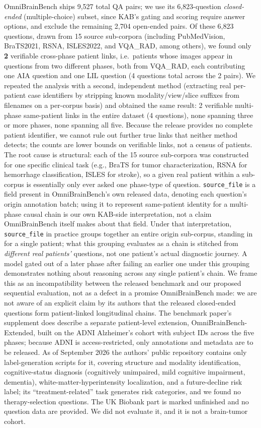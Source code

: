 \documentclass[11pt]{article}
\begin{document}
OmniBrainBench ships 9,527 total QA pairs; we use its 6,823-question \emph{closed-ended} (multiple-choice) subset, since KAB's gating and scoring require answer options, and exclude the remaining 2,704 open-ended pairs. Of these 6,823 questions, drawn from 15 source sub-corpora (including PubMedVision, BraTS2021, RSNA, ISLES2022, and VQA\_RAD, among others), we found only \textbf{2} verifiable cross-phase patient links, i.e.\ patients whose images appear in questions from two different phases, both from VQA\_RAD, each contributing one AIA question and one LIL question (4 questions total across the 2 pairs). We repeated the analysis with a second, independent method (extracting real per-patient case identifiers by stripping known modality/view/slice suffixes from filenames on a per-corpus basis) and obtained the same result: 2 verifiable multi-phase same-patient links in the entire dataset (4 questions), none spanning three or more phases, none spanning all five. Because the release provides no complete patient identifier, we cannot rule out further true links that neither method detects; the counts are lower bounds on verifiable links, not a census of patients. The root cause is structural: each of the 15 source sub-corpora was constructed for one specific clinical task (e.g., BraTS for tumor characterization, RSNA for hemorrhage classification, ISLES for stroke), so a given real patient within a sub-corpus is essentially only ever asked one phase-type of question. \texttt{source\_file} is a field present in OmniBrainBench's own released data, denoting each question's origin annotation batch; using it to represent same-patient identity for a multi-phase causal chain is our own KAB-side interpretation, not a claim OmniBrainBench itself makes about that field. Under that interpretation, \texttt{source\_file} in practice groups together an entire origin sub-corpus, standing in for a single patient; what this grouping evaluates as a chain is stitched from \emph{different real patients'} questions, not one patient's actual diagnostic journey. A model gated out of a later phase after failing an earlier one under this grouping demonstrates nothing about reasoning across any single patient's chain. We frame this as an incompatibility between the released benchmark and our proposed sequential evaluation, not as a defect in a promise OmniBrainBench made: we are not aware of an explicit claim by its authors that the released closed-ended questions form patient-linked longitudinal chains. The benchmark paper's supplement does describe a separate patient-level extension, OmniBrainBench-Extended, built on the ADNI Alzheimer's cohort with subject IDs across the five phases; because ADNI is access-restricted, only annotations and metadata are to be released. As of September 2026 the authors' public repository contains only label-generation scripts for it, covering structure and modality identification, cognitive-status diagnosis (cognitively unimpaired, mild cognitive impairment, dementia), white-matter-hyperintensity localization, and a future-decline risk label; its ``treatment-related'' task generates risk categories, and we found no therapy-selection questions. The UK Biobank part is marked unfinished and no question data are provided. We did not evaluate it, and it is not a brain-tumor cohort.
\end{document}
